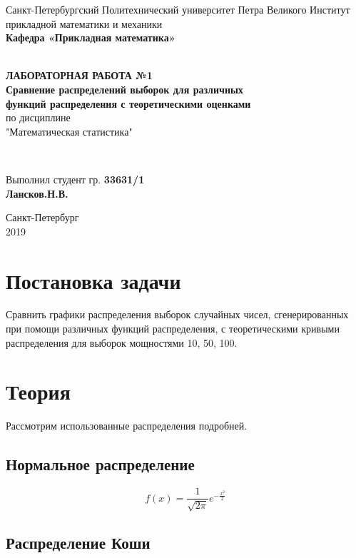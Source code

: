 \documentclass[12pt]{article}
\begin{document}
\begin{titlepage}
	\center
		Санкт-Петербургский Политехнический 
		университет Петра Великого
		Институт прикладной математики и механики
		\\ \textbf{Кафедра «Прикладная математика»}

	\vfill ~
	\textbf{
		\\ \large ЛАБОРАТОРНАЯ РАБОТА №1
		\\	\normalsize	
			Сравнение распределений выборок для различных 
		\\	функций распределения с теоретическими оценками
	}
	\\	по дисциплине 
	\\	"Математическая статистика"

	\vfill ~

	Выполнил студент гр. \textbf{33631/1} \\
	\textbf{Лансков.Н.В.} \\ 

\vfill

{\large}	Санкт-Петербург
\\ 2019
\end{titlepage}

\tableofcontents
\pagebreak


\section{Постановка задачи}
Сравнить графики распределения выборок случайных чисел, сгенерированных при помощи различных функций распределения, с теоретическими кривыми распределения для выборок мощностями 10, 50, 100.

\section{Теория}
Рассмотрим использованные распределения подробней.

\subsection{Нормальное распределение}

\begin{equation}
f(x)= \frac{1}{\sqrt{2\pi}}e^{-\frac{x^2}{2}}
\end{equation}

\subsection{Распределение Коши}
\end{document}
